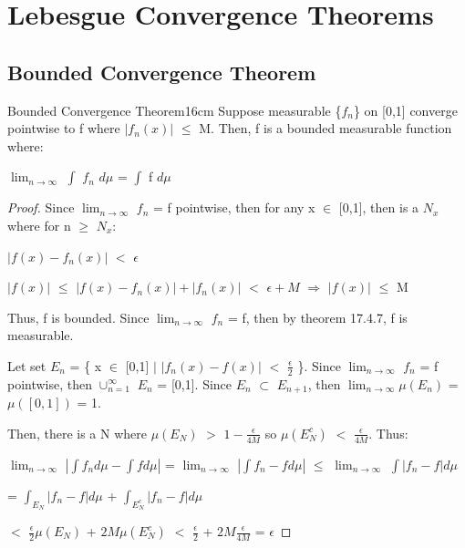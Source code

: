 \newpage

\section[Day 18: Convergence Theorems]{ Lebesgue Convergence Theorems }

\subsection{ Bounded Convergence Theorem }

    \begin{wtheorem}{Bounded Convergence Theorem}{16cm}
        Suppose measurable \{$f_n$\} on [0,1] converge pointwise to f where
        $|f_n(x)|$ $\leq$ M.
        Then, f is a bounded measurable function where:
        
        \hspace{0.5cm}
        $\lim_{n \rightarrow \infty}$ $\int$ $f_n$ $d\mu$ = $\int$ f $d\mu$
    \end{wtheorem}

    \begin{proof}
        Since $\lim_{n \rightarrow \infty}$ $f_n$ = f pointwise, then
        for any x $\in$ [0,1], then is a $N_x$ where for n $\geq$ $N_x$:

        \hspace{0.5cm}
        $|f(x) - f_n(x)|$ $<$ $\epsilon$

        \hspace{0.5cm}
        $|f(x)|$ $\leq$ $|f(x) - f_n(x)| + |f_n(x)|$ $<$ $\epsilon + M$
        \hspace{1cm}
        $\Rightarrow$
        \hspace{1cm}
        $|f(x)|$ $\leq$ M

        Thus, f is bounded.
        Since $\lim_{n \rightarrow \infty}$ $f_n$ = f, then by
        {\color{red} theorem 17.4.7}, f is measurable.

        Let set $E_n$ = \{ x $\in$ [0,1] $|$
                            $|f_n(x) - f(x)|$ $<$ $\frac{\epsilon}{2}$ \}.
        Since $\lim_{n \rightarrow \infty}$ $f_n$ = f pointwise, then
        $\cup_{n=1}^{\infty}$ $E_n$ = [0,1].
        Since $E_n$ $\subset$ $E_{n+1}$, then
        $\lim_{n \rightarrow \infty} \mu(E_n)$ = $\mu([0,1])$ = 1.

        Then, there is a N where $\mu(E_N)$ $>$ $1 - \frac{\epsilon}{4M}$
        so $\mu(E_N^c)$ $<$ $\frac{\epsilon}{4M}$. Thus:

        \hspace{0.5cm}
        $\lim_{n \rightarrow \infty}$ $|\int f_n d\mu - \int f d\mu|$
        = $\lim_{n \rightarrow \infty}$ $|\int f_n - f d\mu|$
        $\leq$ $\lim_{n \rightarrow \infty}$ $\int |f_n - f| d\mu$

        \hspace{5.25cm}
        = $\int_{E_N} |f_n - f| d\mu$ + $\int_{E_N^c} |f_n - f| d\mu$

        \hspace{5.25cm}
        $<$ $\frac{\epsilon}{2} \mu(E_N)$ + $2M \mu(E_N^c)$
        $<$ $\frac{\epsilon}{2}$ + $2M \frac{\epsilon}{4M}$
        = $\epsilon$
    \end{proof}

